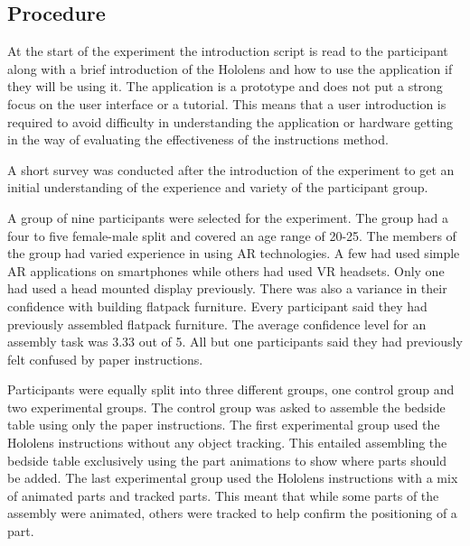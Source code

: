 \documentclass{l4proj}
\begin{document}
\subsection{Procedure}

At the start of the experiment the introduction script is read to the participant along with a brief introduction of the Hololens and how to use the application if they will be using it. The application is a prototype and does not put a strong focus on the user interface or a tutorial. This means that a user introduction is required to avoid difficulty in understanding the application or hardware getting in the way of evaluating the effectiveness of the instructions method.

A short survey was conducted after the introduction of the experiment to get an initial understanding of the experience and variety of the participant group.

A group of nine participants were selected for the experiment. The group had a four to five female-male split and covered an age range of 20-25. The members of the group had varied experience in using AR technologies. A few had used simple AR applications on smartphones while others had used VR headsets. Only one had used a head mounted display previously. There was also a variance in their confidence with building flatpack furniture. Every participant said they had previously assembled flatpack furniture. The average confidence level for an assembly task was 3.33 out of 5. All but one participants said they had previously felt confused by paper instructions.

Participants were equally split into three different groups, one control group and two experimental groups. The control group was asked to assemble the bedside table using only the paper instructions. The first experimental group used the Hololens instructions without any object tracking. This entailed assembling the bedside table exclusively using the part animations to show where parts should be added. The last experimental group used the Hololens instructions with a mix of animated parts and tracked parts. This meant that while some parts of the assembly were animated, others were tracked to help confirm the positioning of a part.
\end{document}
